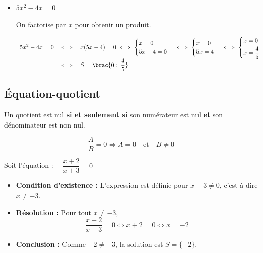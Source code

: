 \begin{methode}
\begin{correction}
\begin{itemize}
			\item $5x^2 - 4x = 0$

			      On factorise par $x$ pour obtenir un produit.

			      \[
				      \begin{array}{rcl}
					      5x^2 - 4x = 0 & \iff & x(5x - 4) = 0 \iff \begin{cases}
						                                                x = 0 \\
						                                                5x - 4 = 0
					                                                \end{cases} \iff \begin{cases}
						                                                                 x = 0 \\
						                                                                 5x = 4
					                                                                 \end{cases} \iff \begin{cases}
						                                                                                  x = 0 \\[1mm]
						                                                                                  x = \dfrac{4}{5}
					                                                                                  \end{cases} \\[3mm] %
					                    & \iff & S = \brac{0\ ;\ \dfrac{4}{5}}
				      \end{array}
			      \]
		\end{itemize}
	\end{correction}
\end{methode}

\subsection{Équation-quotient}

\begin{prop}
	Un quotient est nul \textbf{si et seulement si} son numérateur est nul \textbf{et} son dénominateur est non nul.

	\[
		\dfrac{A}{B} = 0 \iff A = 0 \quad \text{et} \quad B \neq 0
	\]
\end{prop}

\begin{ex}
	Soit l'équation : $\quad\dfrac{x+2}{x+3} = 0$

	\begin{itemize}
		\item \textbf{Condition d'existence :} L'expression est définie pour $x + 3 \neq 0$, c'est-à-dire $x \neq -3$.
		\item \textbf{Résolution :} Pour tout $x \neq -3$,
		      \[
			      \dfrac{x+2}{x+3} = 0 \iff x + 2 = 0 \iff x = -2
		      \]
		\item \textbf{Conclusion :} Comme $-2 \neq -3$, la solution est $S = \{-2\}$.
	\end{itemize}
\end{ex}


